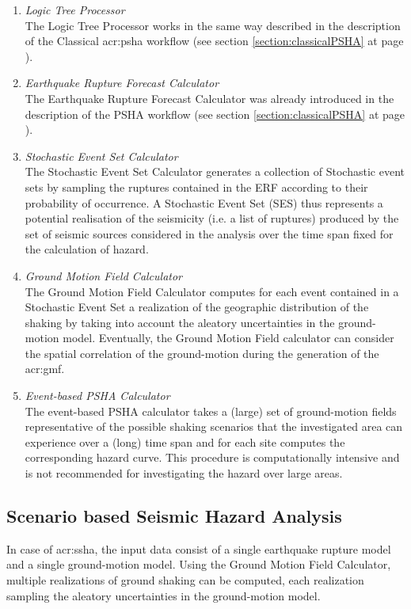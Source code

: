\begin{enumerate}
%
\item \emph{Logic Tree Processor} \hfill \\
The Logic Tree Processor works in the same way described in 
the description of the Classical \gls{acr:psha} workflow 
(see section \ref{section:classicalPSHA} at page 
\pageref{section:classicalPSHA}).
%
\item \emph{Earthquake Rupture Forecast Calculator} \hfill \\ 
The Earthquake Rupture Forecast Calculator was already 
introduced in the description of the PSHA workflow (see section 
\ref{section:classicalPSHA} at page \pageref{section:classicalPSHA}).
%
\item \emph{Stochastic Event Set Calculator} \hfill \\
The Stochastic Event Set Calculator generates a collection of Stochastic 
event sets by sampling the ruptures contained in the ERF according to their 
probability of occurrence. 
%
A Stochastic Event Set (SES) thus represents a potential realisation of the 
seismicity (i.e. a list of ruptures) produced by the set of seismic sources 
considered in the analysis over the time span fixed for the 
calculation of hazard. 
%
\item \emph{Ground Motion Field Calculator} \hfill \\
The Ground Motion Field Calculator computes for each event contained in a 
Stochastic Event Set a realization of the geographic distribution of the 
shaking by taking into account the aleatory uncertainties in 
the ground-motion model. Eventually, the Ground Motion Field calculator 
can consider the spatial correlation of the ground-motion during the 
generation of the \gls{acr:gmf}.
%
\item \emph{Event-based PSHA Calculator} \hfill \\
The event-based PSHA calculator takes a (large) set of ground-motion 
fields representative of the possible shaking scenarios that the investigated
area can experience over a (long) time span and for each 
site computes the corresponding hazard curve. 
%
This procedure is computationally intensive and is not recommended for 
investigating the hazard over large areas. 
\end{enumerate}
%
\subsection{Scenario based Seismic Hazard Analysis}
\label{section:deterministicSHA}
In case of \gls{acr:ssha}, the input data consist of a single earthquake 
rupture model and a single ground-motion model. Using the Ground Motion Field 
Calculator, multiple realizations of ground shaking can be computed, each 
realization sampling the aleatory uncertainties in the ground-motion model.

